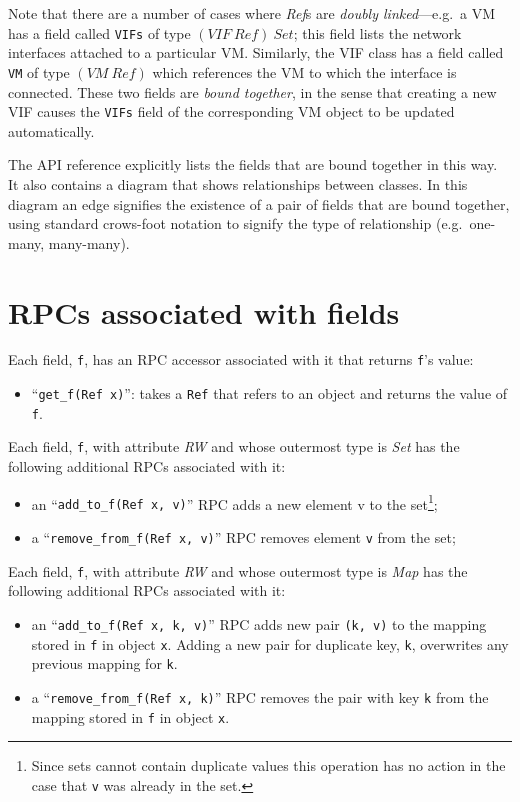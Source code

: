 Note that there are a number of cases where {\em Ref}s are {\em doubly
linked\/}---e.g.\ a VM has a field called {\tt VIFs} of type
$(\mathit{VIF}~\mathit{Ref})~\mathit{Set}$; this field lists
the network interfaces attached to a particular VM. Similarly, the VIF
class has a field called {\tt VM} of type $(\mathit{VM}~{\mathit
Ref})$ which references the VM to which the interface is connected.
These two fields are {\em bound together\/}, in the sense that
creating a new VIF causes the {\tt VIFs} field of the corresponding
VM object to be updated automatically.

The API reference explicitly lists the fields that are
bound together in this way. It also contains a diagram that shows
relationships between classes. In this diagram an edge signifies the
existence of a pair of fields that are bound together, using standard
crows-foot notation to signify the type of relationship (e.g.\
one-many, many-many).

\section{RPCs associated with fields}

Each field, {\tt f}, has an RPC accessor associated with it
that returns {\tt f}'s value:
\begin{itemize}
\item ``{\tt get\_f(Ref x)}'': takes a
{\tt Ref} that refers to an object and returns the value of {\tt f}.
\end{itemize}

Each field, {\tt f}, with attribute
{\em RW} and whose outermost type is {\em Set\/} has the following
additional RPCs associated with it:
\begin{itemize}
\item an ``{\tt add\_to\_f(Ref x, v)}'' RPC adds a new element v to the set\footnote{
%
Since sets cannot contain duplicate values this operation has no action in the case
that {\tt v} was already in the set.
%
};
\item a ``{\tt remove\_from\_f(Ref x, v)}'' RPC removes element {\tt v} from the set;
\end{itemize}

Each field, {\tt f}, with attribute
{\em RW} and whose outermost type is {\em Map\/} has the following
additional RPCs associated with it:
\begin{itemize}
\item an ``{\tt add\_to\_f(Ref x, k, v)}'' RPC adds new pair {\tt (k, v)}
to the mapping stored in {\tt f} in object {\tt x}. Adding a new pair for duplicate
key, {\tt k}, overwrites any previous mapping for {\tt k}.
\item a ``{\tt remove\_from\_f(Ref x, k)}'' RPC removes the pair with key {\tt k}
from the mapping stored in {\tt f} in object {\tt x}.
\end{itemize}

